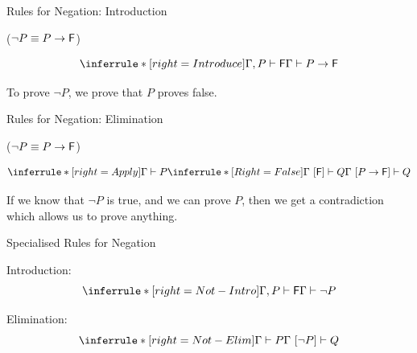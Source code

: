 \documentclass[xetex,aspectratio=169,14pt,hyperref={pdfpagelabels=true,pdflang={en-GB}}]{beamer}
\begin{document}
\begin{frame}
  {Rules for Negation: Introduction}

  \textcolor{black!60}{($\lnot P \equiv P \to \mathsf{F}$)}

  \medskip

  \begin{displaymath}
    \inferrule* [right=Introduce]
    {\Gamma, P \vdash \false}
    {\Gamma \vdash P \to \false}
  \end{displaymath}

  \bigskip

  To prove $\lnot P$, we prove that $P$ proves false.
\end{frame}

\begin{frame}
  {Rules for Negation: Elimination}

  \textcolor{black!60}{($\lnot P \equiv P \to \mathsf{F}$)}

  \medskip

  \begin{displaymath}
    \inferrule* [right=Apply]
    {\Gamma \vdash P \\ \inferrule* [Right=False] { } {\Gamma~[\false] \vdash Q}}
    {\Gamma~[P \to \false] \vdash Q}
  \end{displaymath}

  \bigskip

  If we know that $\lnot P$ is true, and we can prove $P$, then we get
  a contradiction which allows us to prove anything.
\end{frame}

\begin{frame}
  {Specialised Rules for Negation}

  Introduction:
  \begin{displaymath}
    \inferrule* [right=Not-Intro]
    {\Gamma, P \vdash \false}
    {\Gamma \vdash \lnot P}
  \end{displaymath}

  \bigskip

  Elimination:
  \begin{displaymath}
    \inferrule* [right=Not-Elim]
    {\Gamma \vdash P}
    {\Gamma~[\lnot P] \vdash Q}
  \end{displaymath}
\end{frame}
\end{document}
